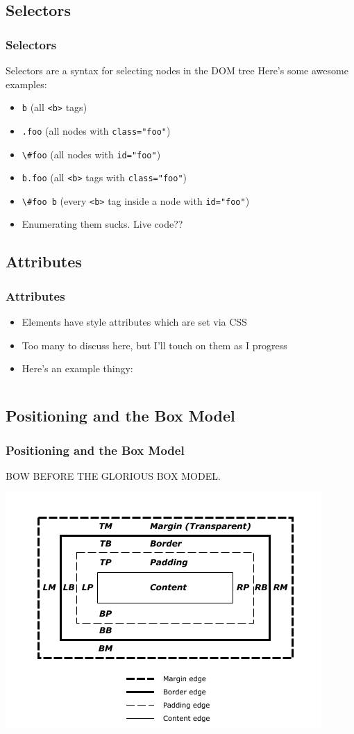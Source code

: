 \documentclass[10pt]{beamer}
\begin{document}
\subsection{Selectors}
\frame
{
  \frametitle{Selectors}

  Selectors are a syntax for selecting nodes in the DOM tree
  Here's some awesome examples:
  \begin{itemize}
    \item \lstinline|b| (all \lstinline|<b>| tags)
    \item \lstinline|.foo| (all nodes with \lstinline|class="foo"|)
    \item \lstinline|\#foo| (all nodes with \lstinline|id="foo"|)
    \item \lstinline|b.foo| (all \lstinline|<b>| tags with \lstinline|class="foo"|)
    \item \lstinline|\#foo b| (every \lstinline|<b>| tag inside a node with \lstinline|id="foo"|)
    \item Enumerating them sucks. Live code??
  \end{itemize}
}

\subsection{Attributes}
\frame
{
  \frametitle{Attributes}

  \begin{itemize}
    \item Elements have style attributes which are set via CSS
    \item Too many to discuss here, but I'll touch on them as I progress
    \item Here's an example thingy:
  \end{itemize}

  \inputminted{css}{./code/css_attrs.css}
}

\subsection{Positioning and the Box Model}
\frame
{
  \frametitle{Positioning and the Box Model}

  BOW BEFORE THE GLORIOUS BOX MODEL.

  \begin{center}
    \includegraphics[scale=0.65]{./images/box_model.png}
  \end{center}
}
\end{document}
